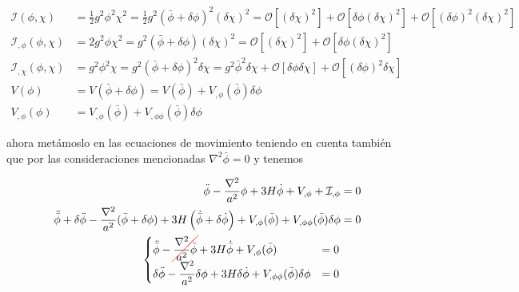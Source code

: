 \begin{equation*}
    \begin{split}
        \mathcal{I} (\phi, \chi) &= \frac{1}{2} g^2 \phi^2 \chi^2 = \frac{1}{2} g^2 (\bar{\phi} + \delta \phi)^2 (\delta \chi)^2 = \mathcal{O}\left[ (\delta \chi)^2 \right] + \mathcal{O} \left[ \delta \phi (\delta \chi)^2 \right] + \mathcal{O} \left[ (\delta \phi)^2 (\delta \chi)^2 \right]\\
        \mathcal{I}_{,\phi} (\phi, \chi) &= 2 g^2 \phi \chi^2 = g^2 (\bar{\phi} + \delta \phi) (\delta \chi)^2 = \mathcal{O} \left[ (\delta \chi)^2 \right] + \mathcal{O} \left[ \delta \phi (\delta \chi)^2 \right]\\
        \mathcal{I}_{,\chi} (\phi, \chi) &= g^2 \phi^2 \chi = g^2 (\bar{\phi} + \delta \phi)^2 \delta \chi = g^2 \bar{\phi}^2 \delta \chi + \mathcal{O} \left[ \delta \phi \delta \chi \right] + \mathcal{O} \left[ (\delta  \phi)^2 \delta \chi \right]\\
        V (\phi) &= V(\bar{\phi} + \delta \phi) = V(\bar{\phi}) + V_{,\phi} (\bar{\phi}) \delta \phi\\
        V_{,\phi} (\phi) &= V_{,\phi} (\bar{\phi}) + V_{,\phi\phi} (\bar{\phi}) \delta \phi
    \end{split}
\end{equation*}

\noindent
ahora metámoslo en las ecuaciones de movimiento teniendo en cuenta también que por las consideraciones mencionadas $\nabla^2 \bar{\phi} = 0$ y tenemos

\begin{equation*}
    \begin{split}
        \ddot{\phi} - \frac{\nabla^2}{a^2} \phi + 3 H \dot{\phi} + V_{,\phi} + \mathcal{I}_{,\phi} &= 0\\
        \ddot{\bar{\phi}} + \delta \ddot{\phi} - \frac{\nabla^2}{a^2} (\bar{\phi} + \delta \phi) + 3 H \left( \dot{\bar{\phi}} + \delta \dot{\phi} \right) + V_{,\phi} (\bar{\phi}) + V_{,\phi\phi} (\bar{\phi}) \delta \phi &= 0\\
        \begin{cases}
            \displaystyle \ddot{\bar{\phi}} - \colorcancel{red}{\frac{\nabla^2}{a^2} \bar{\phi}} + 3 H \dot{\bar{\phi}} + V_{,\phi} (\bar{\phi}) &= 0\\
            \displaystyle \delta \ddot{\phi} - \frac{\nabla^2}{a^2} \delta \phi + 3 H \delta \dot{\phi} + V_{,\phi\phi} (\bar{\phi}) \delta \phi &= 0
        \end{cases}
    \end{split}
\end{equation*}

